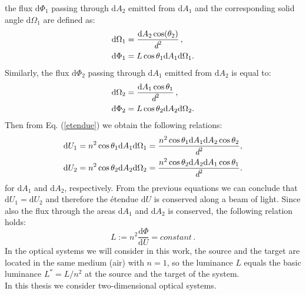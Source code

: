 the flux $\textrm{d}\Phi_1$ passing through $\textrm{d}A_2$ emitted from $\textrm{d}A_1$ and the corresponding solid angle $\textrm{d}\Omega_1 $ are defined as:
\begin{equation}
\begin{split}
\textrm{d}\Omega_1 &= \frac{\textrm{d}A_2\cos(\theta_2)}{\textit{d}^2}\,,\\
\textrm{d}\Phi_1 &= L \cos\theta_1 \textrm{d}A_1 \textrm{d}\Omega_1. 
\end{split}
\end{equation}
Similarly, the flux $\textrm{d}\Phi_2$ passing through $\textrm{d}A_1$ emitted from $\textrm{d}A_2$ is equal to:
\begin{equation}\begin{split}
\textrm{d}\Omega_2 &= \frac{\textrm{d}A_1\cos\theta_1}{\textit{d}^2}\,,\\
\textrm{d}\Phi_2 &= L \cos\theta_2 \textrm{d}A_2 \textrm{d}\Omega_2.
\end{split}
\end{equation}
Then from Eq. (\ref{etendue}) we obtain the following relations: \begin{equation}
\begin{split}
\textrm{d}U_1 &= n^2\cos\theta_1 \textrm{d}A_1\textrm{d}\Omega_1= \frac{n^2\cos\theta_1 \textrm{d}A_1\textrm{d}A_2\cos\theta_2}{\textit{d}^2},\\
\textrm{d}U_2 &= n^2 \cos\theta_2\textrm{d}A_2\textrm{d}\Omega_2= \frac{ n^2 \cos\theta_2\textrm{d}A_2\textrm{d}A_1\cos\theta_1}{\textit{d}^2}.
\end{split}
\end{equation}
for $\textrm{d}A_1$ and $\textrm{d}A_2$, respectively.
From the previous equations we can conclude that $\textrm{d}U_1=\textrm{d}U_2$ and therefore the \'{e}tendue $\textrm{d}U$ is conserved along a beam of light. 
Since also the flux through the areas $\textrm{d}A_1$ and $\textrm{d}A_2$ is conserved, the following relation holds:
\begin{equation}\label{basicluminance}
L := n^2 \frac{\textrm{d}\Phi}{\textrm{d}U} = constant\,.
\end{equation}
 In the optical systems we will consider in this work, the source and the target are located in the same medium (air) with $n=1$, so the luminance $L$ equals the basic luminance $L^* = L/n^2$ at the source and the target of the system.\\
\indent In this thesis we consider two-dimensional optical systems. 
